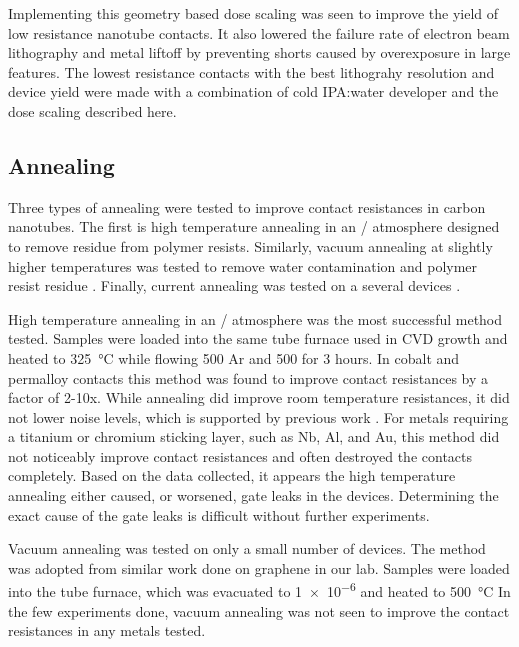 Implementing this geometry based dose scaling was seen to improve the yield of low resistance nanotube contacts. It also lowered the failure rate of electron beam lithography and metal liftoff by preventing shorts caused by overexposure in large features. The lowest resistance contacts with the best lithograhy resolution and device yield were made with a combination of cold IPA:water developer and the dose scaling described here.

\subsection{Annealing}
\label{sec:annealing}

Three types of annealing were tested to improve contact resistances in carbon nanotubes. The first is high temperature annealing in an / atmosphere \cite{Garcia2012, Lee2000, Kane2009, Kane2011, Stokes2010} designed to remove residue from polymer resists. Similarly, vacuum annealing at slightly higher temperatures was tested to remove water contamination and polymer resist residue \cite{Derycke2002, Kim2003, Pirkle2011, Chan2012, Cheng2011}. Finally, current annealing was tested on a several devices \cite{Gramich2015, Wu2010}.

High temperature annealing in an / atmosphere was the most successful method tested. Samples were loaded into the same tube furnace used in CVD growth and heated to \SI{325}{\celsius} while flowing \SI{500}{\sccm} Ar and \SI{500}{\sccm}  for 3 hours. In cobalt and permalloy contacts this method was found to improve contact resistances by a factor of 2-10x. While annealing did improve room temperature resistances, it did not lower noise levels, which is supported by previous work \cite{Preusche2009}. For metals requiring a titanium or chromium sticking layer, such as Nb, Al, and Au, this method did not noticeably improve contact resistances and often destroyed the contacts completely. Based on the data collected, it appears the high temperature annealing either caused, or worsened, gate leaks in the devices. Determining the exact cause of the gate leaks is difficult without further experiments. 

Vacuum annealing was tested on only a small number of devices. The method was adopted from similar work done on graphene in our lab. Samples were loaded into the tube furnace, which was evacuated to \SI{1e-6}{\torr} and heated to \SI{500}{\celsius} In the few experiments done, vacuum annealing was not seen to improve the contact resistances in any metals tested. 

